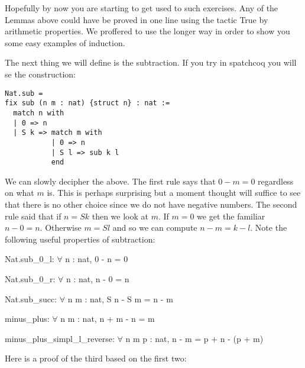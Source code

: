 Hopefully by now you are starting to get used to such exercises. Any of the Lemmas above could have be proved in one line using the tactic
True by arithmetic properties. We proffered to use the longer way in order to show you some easy examples of induction.

The next thing we will define is the subtraction. If you try 
 in spatchcoq you will se the construction:

\begin{verbatim}
Nat.sub = 
fix sub (n m : nat) {struct n} : nat :=
  match n with
  | 0 => n
  | S k => match m with
           | 0 => n
           | S l => sub k l
           end
\end{verbatim} 

We can slowly decipher the above. The first rule says that $0-m =0$ regardless on what $m$ is. This is perhaps surprising but a moment thought will suffice to see that there is no other choice since we do not have negative numbers.
The second rule said that if $n= S k$ then we look at $m$. If $m=0$ we get the familiar $n-0=n$. Otherwise $m= S l$ and so we can compute $n-m = k-l$. Note the following useful properties of subtraction:


Nat.sub\_0\_l: $\forall$ n : nat, 0 - n = 0 

Nat.sub\_0\_r: $\forall$  n : nat, n - 0 = n

Nat.sub\_succ: $\forall$ n m : nat, S n - S m = n - m

minus\_plus: $\forall$ n m : nat, n + m - n = m

minus\_plus\_simpl\_l\_reverse: $\forall$ n m p : nat, n - m = p + n - (p + m)


Here is a proof of the third based on the first two:

